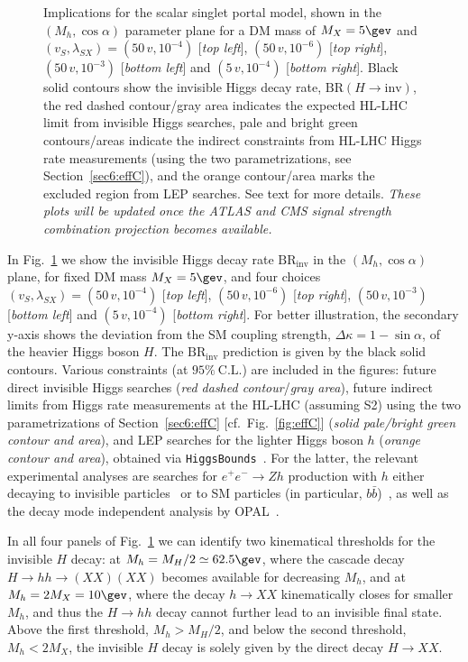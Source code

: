 \documentclass[../report.tex]{subfiles}
\newcommand{\BRHinv}{\mathrm{BR}_\mathrm{inv}}
\newcommand{\CL}{~\mathrm{C.L.}}
\begin{document}
\begin{figure}[t]
\caption{{Implications for the scalar singlet portal model, shown in the $(M_h, \cos\alpha)$ parameter plane for a DM mass of $M_X = 5\gev$ and $(v_S, \lambda_{SX}) = (50\,v, 10^{-4})$ [\emph{top left}], $(50\,v, 10^{-6})$ [\emph{top right}], $(50\,v, 10^{-3})$ [\emph{bottom left}] and $(5\,v, 10^{-4})$ [\emph{bottom right}]. Black solid contours show the invisible Higgs decay rate, $\mathrm{BR}(H\to \mathrm{inv})$, the red dashed contour/gray area indicates the expected HL-LHC limit from invisible Higgs searches, pale and bright green contours/areas indicate the indirect constraints from HL-LHC Higgs rate measurements (using the two parametrizations, see Section~\ref{sec6:effC}), and the orange contour/area marks the excluded region from LEP searches. See text for more details.} {\sl These plots will be updated once the ATLAS and CMS signal strength combination projection becomes available.}}
\label{Fig:singletportal}
\end{figure}
 
 In Fig.~\ref{Fig:singletportal} we show the invisible Higgs decay rate $\BRHinv$ in the $(M_h, \cos\alpha)$ plane, for fixed DM mass $M_X = 5\gev$, and four choices $(v_S, \lambda_{SX}) = (50\,v, 10^{-4})$ [\emph{top left}], $(50\,v, 10^{-6})$ [\emph{top right}], $(50\,v, 10^{-3})$ [\emph{bottom left}] and $(5\,v, 10^{-4})$ [\emph{bottom right}]. For better illustration, the secondary y-axis shows the deviation from the SM coupling strength, $\Delta \kappa = 1 -\sin\alpha$, of the heavier Higgs boson $H$. The $\BRHinv$ prediction is given by the black solid contours. Various constraints (at $95\%\CL$) are included in the figures: future direct invisible Higgs searches (\emph{red dashed contour}/\emph{gray area}), future indirect limits from Higgs rate measurements {at the HL-LHC (assuming S2)} using the two parametrizations of Section~\ref{sec6:effC} [cf.~Fig.~\ref{fig:effC}] (\emph{solid pale/bright green contour and area}), and LEP searches for the lighter Higgs boson $h$ (\emph{orange contour and area}), obtained via \texttt{HiggsBounds}~\cite{Bechtle:2008jh,Bechtle:2011sb,Bechtle:2013wla}. For the latter, the relevant experimental analyses are searches for $e^+e^-\to Zh$ production with $h$ either decaying to invisible particles~\cite{Searches:2001ab,Abdallah:2003ry,Achard:2004cf,Abbiendi:2007ac} or to SM particles (in particular, $b\bar{b}$)~\cite{Schael:2006cr}, as well as the decay mode independent analysis by OPAL~\cite{Abbiendi:2002qp}.



In all four panels of Fig.~\ref{Fig:singletportal} we can identify two kinematical thresholds for the invisible $H$ decay: at $M_h = M_H/2 \simeq 62.5\gev$, where the cascade decay $H\to hh\to (XX)(XX)$ becomes available for decreasing $M_h$, and at $M_h = 2 M_X = 10\gev$, where the decay $h\to XX$ kinematically closes for smaller $M_h$, and thus the $H\to hh$ decay cannot further lead to an invisible final state. Above the first threshold, $M_h > M_H/2$, and below the second threshold, $M_h < 2M_X$, the invisible $H$ decay is solely given by {the direct decay} $H\to XX$. 
\end{document}
